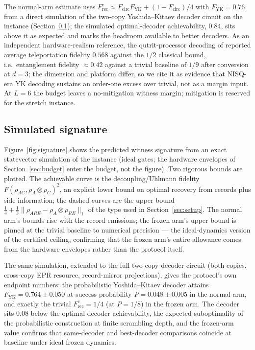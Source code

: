 \documentclass[11pt]{article}
\newcommand{\Frec}{F^{e}_{\mathrm{rec}}}
\begin{document}
The normal-arm estimate uses
$\Frec \approx F_{\mathrm{circ}} F_{\mathrm{YK}} +
(1-F_{\mathrm{circ}})/4$ with $F_{\mathrm{YK}} = 0.76$ from a direct
simulation of the two-copy Yoshida--Kitaev decoder circuit on the
instance (Section~\ref{sec:signature}); the simulated
optimal-decoder achievability, $0.84$, sits above it as expected and
marks the headroom available to better decoders.  As an
independent hardware-realism
reference, the qutrit-processor decoding of \citet{Blok2021}
reported average teleportation fidelity $0.568$ against the $1/2$
classical bound, i.e.\ entanglement fidelity $\approx 0.42$ against
a trivial baseline of $1/9$ after conversion at $d = 3$; the
dimension and platform differ, so we cite it as evidence that
NISQ-era YK decoding sustains an order-one excess over trivial, not
as a margin input.  At $L = 6$ the budget leaves a no-mitigation
witness margin; mitigation is reserved for the stretch instance.

\subsection{Simulated signature}
\label{sec:signature}

Figure~\ref{fig:signature} shows the predicted witness signature
from an exact statevector simulation of the instance (ideal gates;
the hardware envelopes of Section~\ref{sec:budget} enter the budget,
not the figure).  Two rigorous bounds are plotted.  The achievable
curve is the decoupling/Uhlmann fidelity
$F(\rho_{AC}, \rho_A \otimes \rho_C)^2$, an explicit lower bound on
optimal recovery from records plus side information; the dashed
curves are the upper bound
$\tfrac14 + \tfrac12 \| \rho_{ARE} - \rho_A \otimes \rho_{RE} \|_1$
of the type used in Section~\ref{sec:setup}.  The normal arm's
bounds rise with the record emissions; the frozen arm's upper bound
is pinned at the trivial baseline to numerical precision --- the
ideal-dynamics version of the certified ceiling, confirming that the
frozen arm's entire allowance comes from the hardware envelopes
rather than the protocol itself.

The same simulation, extended to the full two-copy decoder circuit
(both copies, cross-copy EPR resource, record-mirror projections),
gives the protocol's own endpoint numbers: the probabilistic
Yoshida--Kitaev decoder attains $F_{\mathrm{YK}} = 0.764 \pm 0.050$
at success probability $P = 0.048 \pm 0.005$ in the normal arm, and
exactly the trivial $\Frec = 1/4$ (at $P = 1/8$) in the frozen arm.
The decoder sits $0.08$ below the optimal-decoder achievability, the
expected suboptimality of the probabilistic construction at finite
scrambling depth, and the frozen-arm value confirms that
same-decoder and best-decoder comparisons coincide at baseline under
ideal frozen dynamics.
\end{document}
